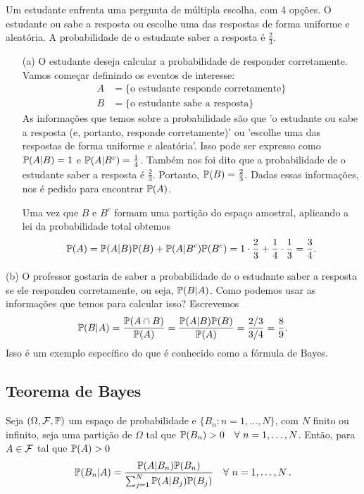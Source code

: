 \begin{example} \label{ex5.1}
Um estudante enfrenta uma pergunta de múltipla escolha, com 4 opções. O estudante ou sabe a resposta ou escolhe uma das respostas de forma uniforme e aleatória. A probabilidade de o estudante saber a resposta é $\frac{2}{3}$. 
\begin{itemize}
    \item[(a)] O estudante deseja calcular a probabilidade de responder corretamente. Vamos começar definindo os eventos de interesse:
\begin{align}
A &= \{\text{o estudante responde corretamente}\} \\
B &= \{\text{o estudante sabe a resposta}\}
\end{align}
As informações que temos sobre a probabilidade são que 'o estudante ou sabe a resposta (e, portanto, responde corretamente)' ou 'escolhe uma das respostas de forma uniforme e aleatória'. Isso pode ser expresso como $\mathbb{P}(A|B) = 1$ e $\mathbb{P}(A|B^c) = \frac{1}{4}$. Também nos foi dito que a probabilidade de o estudante saber a resposta é $\frac{2}{3}$. Portanto, $\mathbb{P}(B) = \frac{2}{3}$. Dadas essas informações, nos é pedido para encontrar $\mathbb{P}(A)$.

Uma vez que $B$ e $B^c$ formam uma partição do espaço amostral, aplicando a lei da probabilidade total obtemos
\[
\mathbb{P}(A) = \mathbb{P}(A|B)\mathbb{P}(B)+\mathbb{P}(A|B^c)\mathbb{P}(B^c) = 1 \cdot \frac{2}{3}+\frac{1}{4}\cdot \frac{1}{3} = \frac{3}{4}.
\]
\end{itemize}
\item[(b)] O professor gostaria de saber a probabilidade de o estudante saber a resposta se ele respondeu corretamente, ou seja, $\mathbb{P}(B|A)$. Como podemos usar as informações que temos para calcular isso? Escrevemos
\[
\mathbb{P}(B|A) = \frac{\mathbb{P}(A\cap B)}{\mathbb{P}(A)} = \frac{\mathbb{P}(A|B)\mathbb{P}(B)}{\mathbb{P}(A)} = \frac{2/3}{3/4} = \frac{8}{9}.
\]
Isso é um exemplo específico do que é conhecido como a fórmula de Bayes.
\end{example}

\subsection{Teorema de Bayes}

\begin{theorem}
Seja $(\Omega,\mathcal F,\mathbb{P})$ um espaço de probabilidade e $\{B_n:n=1,\dots,N\}$, com $N$ finito ou infinito, seja uma partição de $\Omega$ tal que $\mathbb{P}(B_n) >0 \quad \forall \,\, n=1,\dots,N$. Então, para $A \in \mathcal F$ tal que $\mathbb{P}(A)>0$
\begin{equation}
\mathbb{P}(B_n|A) = \frac{\mathbb{P}(A|B_n)\mathbb{P}(B_n)}{\sum_{j=1}^{N}\mathbb{P}(A|B_j)\mathbb{P}(B_j)} \quad \forall \,\, n=1,\dots,N \,.
\end{equation}
\end{theorem}


